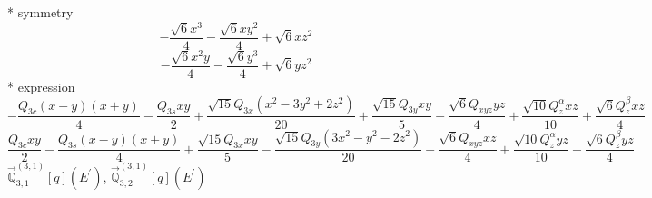 \documentclass[fleqn,8pt]{jsarticle}
\begin{document}
\noindent\quad ** symmetry
\begin{dmath*}
- \frac{\sqrt{6} x^{3}}{4} - \frac{\sqrt{6} x y^{2}}{4} + \sqrt{6} x z^{2}
\end{dmath*}
\begin{dmath*}
- \frac{\sqrt{6} x^{2} y}{4} - \frac{\sqrt{6} y^{3}}{4} + \sqrt{6} y z^{2}
\end{dmath*}
\noindent\quad ** expression
\begin{dmath*}
- \frac{Q_{3c} \left(x - y\right) \left(x + y\right)}{4} - \frac{Q_{3s} x y}{2} + \frac{\sqrt{15} Q_{3x} \left(x^{2} - 3 y^{2} + 2 z^{2}\right)}{20} + \frac{\sqrt{15} Q_{3y} x y}{5} + \frac{\sqrt{6} Q_{xyz} y z}{4} + \frac{\sqrt{10} Q_{z}^{\alpha} x z}{10} + \frac{\sqrt{6} Q_{z}^{\beta} x z}{4}
\end{dmath*}
\begin{dmath*}
\frac{Q_{3c} x y}{2} - \frac{Q_{3s} \left(x - y\right) \left(x + y\right)}{4} + \frac{\sqrt{15} Q_{3x} x y}{5} - \frac{\sqrt{15} Q_{3y} \left(3 x^{2} - y^{2} - 2 z^{2}\right)}{20} + \frac{\sqrt{6} Q_{xyz} x z}{4} + \frac{\sqrt{10} Q_{z}^{\alpha} y z}{10} - \frac{\sqrt{6} Q_{z}^{\beta} y z}{4}
\end{dmath*}
\noindent\quad $\vec{\mathbb{Q}}_{3,1}^{(3,1)}[q](E^{\prime})$, $\vec{\mathbb{Q}}_{3,2}^{(3,1)}[q](E^{\prime})$
\end{document}
